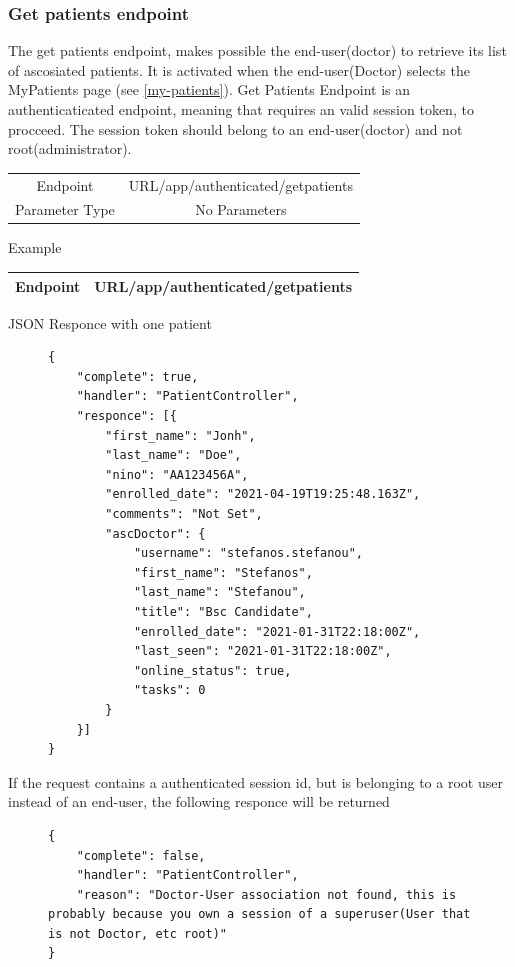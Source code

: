 				\subsubsection{Get patients endpoint}
					The get patients endpoint, makes possible the end-user(doctor) to retrieve its list of ascosiated patients. It is 
					activated when the end-user(Doctor) selects the MyPatients page (see \ref{my-patients}). Get Patients Endpoint 
					is an authenticaticated endpoint, meaning that requires an valid session token, to procceed. The session token 
					should belong to an end-user(doctor) and not root(administrator).
					\begin{center}
						\begin{tabular}{ |c|c| } 
							\hline
							Endpoint & {{URL}}/app/authenticated/getpatients\\
							Parameter Type & No Parameters  \\
							\hline
						\end{tabular}
					\end{center}
					Example
					\begin{center}
						\begin{tabular}{ |c|c| } 
							\hline
							Endpoint & {{URL}}/app/authenticated/getpatients\\
							\hline
						\end{tabular}
					\end{center}
					JSON Responce with one patient
					\begin{figure}[H]
						\iftrue
						\begin{lstlisting}[]
{
	"complete": true,
	"handler": "PatientController",
	"responce": [{
		"first_name": "Jonh",
		"last_name": "Doe",
		"nino": "AA123456A",
		"enrolled_date": "2021-04-19T19:25:48.163Z",
		"comments": "Not Set",
		"ascDoctor": {
			"username": "stefanos.stefanou",
			"first_name": "Stefanos",
			"last_name": "Stefanou",
			"title": "Bsc Candidate",
			"enrolled_date": "2021-01-31T22:18:00Z",
			"last_seen": "2021-01-31T22:18:00Z",
			"online_status": true,
			"tasks": 0
		}
	}]
}
						\end{lstlisting}
					\end{figure}
					If the request contains a authenticated session id, but is belonging to a root user instead of an end-user, the
					following responce will be returned
					\begin{figure}[H]
						\iftrue
						\begin{lstlisting}[]
{
	"complete": false,
	"handler": "PatientController",
	"reason": "Doctor-User association not found, this is probably because you own a session of a superuser(User that is not Doctor, etc root)"
}
						\end{lstlisting}
					\end{figure}
